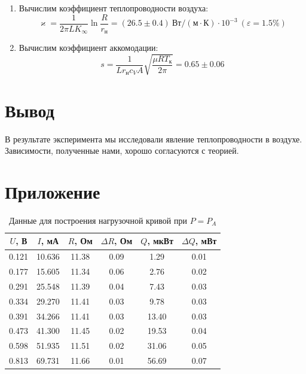 \documentclass[12pt]{article}
\begin{document}
\begin{enumerate}
            \item Вычислим коэффициент теплопроводности воздуха:
            $$
            \varkappa = \frac{1}{2\pi LK_{\infty}}\ln{\frac{R}{r_{\text{н}}}} = (26.5\pm0.4)\ \text{Вт}/(\text{м}\cdot\text{К})\cdot10^{-3} \ (\varepsilon = 1.5\%)
            $$

            \item Вычислим коэффициент аккомодации:
            $$
            s = \frac{1}{Lr_{\text{н}}c_VA}\sqrt{\frac{\mu RT_{\text{к}}}{2\pi}} = 0.65\pm0.06
            $$

        \end{enumerate}
    \section{Вывод}
    В результате эксперимента мы исследовали явление теплопроводности в воздухе. Зависимости, полученные нами,
    хорошо согласуются с теорией.

    \section{Приложение}
    \begin{table}[h]
        \centering
        \caption{Данные для построения нагрузочной кривой при $P = P_A$}
        \label{tab:load}
        \begin{tabular}{|c|c|c|c|c|c|}
        \hline
            $U$, В &  $I$, мА &     $R$, Ом & $\Delta R$, Ом &     $Q$, мкВт & $\Delta Q$, мВт \\ \hline
        0.121 & 10.636 & 11.38 &           0.09 &  1.29 &            0.01 \\ \hline
        0.177 & 15.605 & 11.34 &           0.06 &  2.76 &            0.02 \\ \hline
        0.291 & 25.548 & 11.39 &           0.04 &  7.43 &            0.03 \\ \hline
        0.334 & 29.270 & 11.41 &           0.03 &  9.78 &            0.03 \\ \hline
        0.391 & 34.266 & 11.41 &           0.03 & 13.40 &            0.03 \\ \hline
        0.473 & 41.300 & 11.45 &           0.02 & 19.53 &            0.04 \\ \hline
        0.598 & 51.935 & 11.51 &           0.02 & 31.06 &            0.05 \\ \hline
        0.813 & 69.731 & 11.66 &           0.01 & 56.69 &            0.07 \\ \hline
        \end{tabular}
    \end{table}
\end{document}
